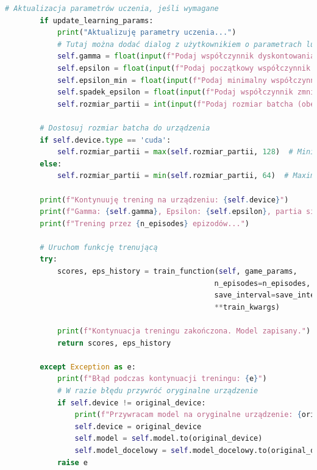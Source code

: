 \documentclass[a4paper,12pt]{article}
\begin{document}
\begin{lstlisting}[language=Python]
        # Aktualizacja parametrów uczenia, jeśli wymagane
        if update_learning_params:
            print("Aktualizuję parametry uczenia...")
            # Tutaj można dodać dialog z użytkownikiem o parametrach lub wczytać je z konfiguracji
            self.gamma = float(input(f"Podaj współczynnik dyskontowania (obecny: {self.gamma}): ") or self.gamma)
            self.epsilon = float(input(f"Podaj początkowy współczynnik eksploracji (obecny: {self.epsilon}): ") or self.epsilon)
            self.epsilon_min = float(input(f"Podaj minimalny współczynnik eksploracji (obecny: {self.epsilon_min}): ") or self.epsilon_min)
            self.spadek_epsilon = float(input(f"Podaj współczynnik zmniejszania eksploracji (obecny: {self.spadek_epsilon}): ") or self.spadek_epsilon)
            self.rozmiar_partii = int(input(f"Podaj rozmiar batcha (obecny: {self.rozmiar_partii}): ") or self.rozmiar_partii)
        
        # Dostosuj rozmiar batcha do urządzenia
        if self.device.type == 'cuda':
            self.rozmiar_partii = max(self.rozmiar_partii, 128)  # Minimum 128 dla GPU
        else:
            self.rozmiar_partii = min(self.rozmiar_partii, 64)  # Maximum 64 dla CPU
    
        print(f"Kontynuuję trening na urządzeniu: {self.device}")
        print(f"Gamma: {self.gamma}, Epsilon: {self.epsilon}, partia size: {self.rozmiar_partii}")
        print(f"Trening przez {n_episodes} epizodów...")
    
        # Uruchom funkcję trenującą
        try:
            scores, eps_history = train_function(self, game_params, 
                                                n_episodes=n_episodes, 
                                                save_interval=save_interval, 
                                                **train_kwargs)
        
            print(f"Kontynuacja treningu zakończona. Model zapisany.")
            return scores, eps_history
        
        except Exception as e:
            print(f"Błąd podczas kontynuacji treningu: {e}")
            # W razie błędu przywróć oryginalne urządzenie
            if self.device != original_device:
                print(f"Przywracam model na oryginalne urządzenie: {original_device}")
                self.device = original_device
                self.model = self.model.to(original_device)
                self.model_docelowy = self.model_docelowy.to(original_device)
            raise e
    
\end{lstlisting}
\end{document}
